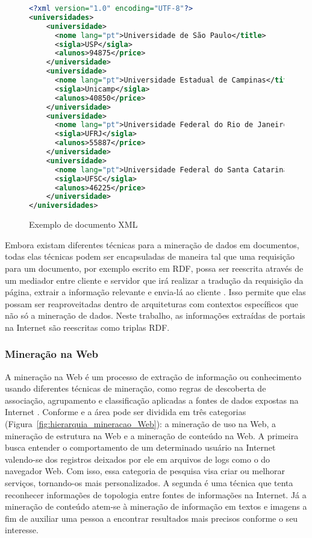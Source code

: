\begin{figure}[!ht]
    \begin{lstlisting}[language=XML]
<?xml version="1.0" encoding="UTF-8"?>
<universidades>
	<universidade>
	  <nome lang="pt">Universidade de São Paulo</title>
	  <sigla>USP</sigla>
	  <alunos>94875</price>
	</universidade>
	<universidade>
	  <nome lang="pt">Universidade Estadual de Campinas</title>
	  <sigla>Unicamp</sigla>
	  <alunos>40850</price>
	</universidade>
	<universidade>
	  <nome lang="pt">Universidade Federal do Rio de Janeiro</title>
	  <sigla>UFRJ</sigla>
	  <alunos>55887</price>
	</universidade>
	<universidade>
	  <nome lang="pt">Universidade Federal do Santa Catarina</title>
	  <sigla>UFSC</sigla>
	  <alunos>46225</price>
	</universidade>
</universidades>
    \end{lstlisting}
    \caption{Exemplo de documento XML}
    \label{fig:exemplo_documento_xml_xpath} 
\end{figure}

Embora existam diferentes técnicas para a mineração de dados em documentos, todas elas técnicas podem ser encapsuladas de maneira tal que uma requisição para um documento, por exemplo escrito em RDF, possa ser reescrita através de um mediador entre cliente e servidor que irá realizar a tradução da requisição da página, extrair a informação relevante e envia-lá ao cliente \citep{Berendt2004, Kushmerick1997}. Isso permite que elas possam ser reaproveitadas dentro de arquiteturas com contextos específicos que não só a mineração de dados. Neste trabalho, as informações extraídas de portais na Internet são reescritas como triplas RDF.

\subsubsection{Mineração na Web}
\label{sec:mineracao_dados_Web}

A mineração na Web é um processo de extração de informação ou conhecimento usando diferentes técnicas de mineração, como regras de descoberta de associação, agrupamento e classificação aplicadas a fontes de dados expostas na Internet \citep{Zhang2011, Quboa2013}. Conforme \citet{Quboa2013} e \citet{Stumme2006} a área pode ser dividida em três categorias (Figura~\ref{fig:hierarquia_mineracao_Web}): a mineração de uso na Web, a mineração de estrutura na Web e a mineração de conteúdo na Web. A primeira busca entender o comportamento de um determinado usuário na Internet valendo-se dos registros deixados por ele em arquivos de logs como o do navegador Web. Com isso, essa categoria de pesquisa visa criar ou melhorar serviços, tornando-os mais personalizados. A segunda é uma técnica que tenta reconhecer informações de topologia entre fontes de informações na Internet. Já a mineração de conteúdo atem-se à mineração de informação em textos e imagens a fim de auxiliar uma pessoa a encontrar resultados mais precisos conforme o seu interesse.

